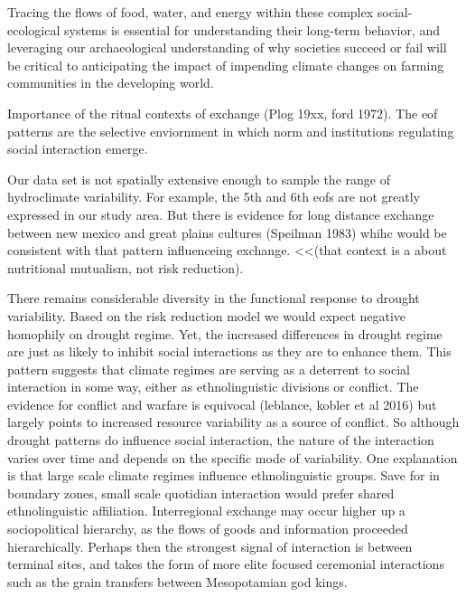 \documentclass[11pt]{wlscirep}
\begin{document}
Tracing the flows of food, water, and energy within these complex social-ecological systems is essential for understanding their long-term behavior, and leveraging our archaeological understanding of why societies succeed or fail will be critical to anticipating the impact of impending climate changes on farming communities in the developing world.

Importance of the ritual contexts of exchange (Plog 19xx, ford 1972). The eof patterns are the selective enviornment in which norm and institutions regulating social interaction emerge. 

Our data set is not spatially extensive enough to sample the range of hydroclimate variability. For example, the 5th and 6th eofs are not greatly expressed in our study area. But there is evidence for long distance exchange between new mexico and great plains cultures (Speilman 1983) whihc would be consistent with that pattern influenceing exchange. <<(that context is a about nutritional mutualism, not risk reduction).

There remains considerable diversity in the functional response to drought variability. Based on the risk reduction model we would expect negative homophily on drought regime. Yet, the increased differences in drought regime are just as likely to inhibit social interactions as they are to enhance them. This pattern suggests that climate regimes are serving as a deterrent to social interaction in some way, either as ethnolinguistic divisions or conflict. The evidence for conflict and warfare is equivocal (leblance, kobler et al 2016) but largely points to increased resource variability as a source of conflict. So although drought patterns do influence social interaction, the nature of the interaction varies over time and depends on the specific mode of variability. One explanation is that large scale climate regimes influence ethnolinguistic groups. Save for in boundary zones, small scale quotidian interaction would prefer shared ethnolinguistic affiliation. Interregional exchange may occur higher up a sociopolitical hierarchy, as the flows of goods and information proceeded hierarchically. Perhaps then the strongest signal of interaction is between terminal sites, and takes the form of more elite focused ceremonial interactions such as the grain transfers between Mesopotamian god kings.

\end{document}
